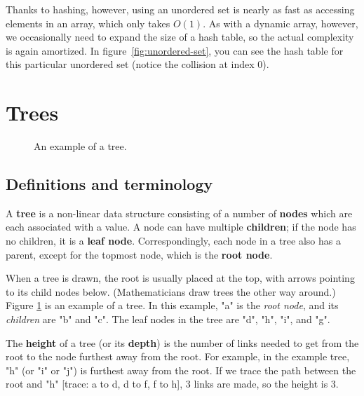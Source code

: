 Thanks to hashing, however, using an unordered set is nearly as fast as accessing elements in an array, which only takes $O(1)$. As with a dynamic array, however, we occasionally need to expand the size of a hash table, so the actual complexity is again amortized. In figure~\ref{fig:unordered-set}, you can see the hash table for this particular unordered set (notice the collision at index 0).


\section{Trees} \label{sec:trees}

\begin{figure}[h]
\centering
{}
\caption{An example of a tree.}
\label{fig:tree0}
\end{figure}


\subsection{Definitions and terminology}

A \textbf{tree} is a non-linear data structure consisting of a number of \textbf{nodes} which are each associated with a value. A node can have multiple \textbf{children}; if the node has no children, it is a \textbf{leaf node}. Correspondingly, each node in a tree also has a parent, except for the topmost node, which is the \textbf{root node}.

When a tree is drawn, the root is usually placed at the top, with arrows pointing to its child nodes below. (Mathematicians draw trees the other way around.) Figure \ref{fig:tree0} is an example of a tree. In this example, "a" is the \textit{root node}, and its \textit{children} are "b" and "c". The leaf nodes in the tree are "d", "h", "i", and "g".



The \textbf{height} of a tree (or its \textbf{depth}) is the number of links needed to get from the root to the node furthest away from the root. For example, in the example tree, "h" (or "i" or "j") is furthest away from the root. If we trace the path between the root and "h" [trace: a to d, d to f, f to h], 3 links are made, so the height is 3.

